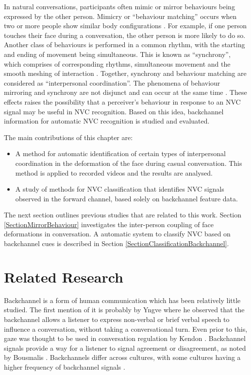 In natural conversations, participants often mimic or mirror behaviours being expressed by the other person. Mimicry or ``behaviour matching'' occurs when two or more people show similar body configurations \cite{Bernieri1991}. For example, if one person touches their face during a conversation, the other person is more likely to do so. 
Another class of behaviours is performed in a common rhythm, with the starting and ending of movement being simultaneous. This is known as ``synchrony'', which comprises of corresponding rhythms, simultaneous movement and the smooth meshing of interaction \cite{Bernieri1991}. Together, synchrony and behaviour matching are considered as ``interpersonal coordination''. The phenomena of behaviour mirroring and synchrony are not disjunct and can occur at the same time \cite{Delaherche2012}. These effects raises the possibility that a perceiver's behaviour in response to an \ac{NVC} signal may be useful in \ac{NVC} recognition. Based on this idea, backchannel information for automatic \ac{NVC} recognition is studied and evaluated. 

The main contributions of this chapter are:

\begin{itemize}
 \item A method for automatic identification of certain types of interpersonal coordination in the deformation of the face during casual conversation. This method is applied to recorded videos and the results are analysed.
 \item A study of \featureGeneration methods for \ac{NVC} classification that identifies \ac{NVC} signals observed in the forward channel, based solely on backchannel feature data.
\end{itemize}

The next section outlines previous studies that are related to this work. Section \ref{SectionMirrorBehaviour} investigates the inter-person coupling of face deformations in conversation. A automatic system to classify \ac{NVC} based on backchannel cues is described in Section \ref{SectionClassificationBackchannel}.

\section{Related Research}
\label{BackgroundNvcIsCoupled}

Backchannel is a form of human communication which has been relatively little studied. The first mention of it is probably by Yngve \cite{Yngve1970} where he observed that the backchannel allows a listener to express non-verbal or brief verbal speech to influence a conversation, without taking a conversational turn. Even prior to this, gaze was thought to be used in conversation regulation by Kendon \cite{Kendon1967}. Backchannel signals provide a way for a listener to signal agreement or disagreement, as noted by Bousmalis \etal \cite{Bousmalis2009}. Backchannels differ across cultures, with some cultures having a higher frequency of backchannel signals \cite{White1989}.

